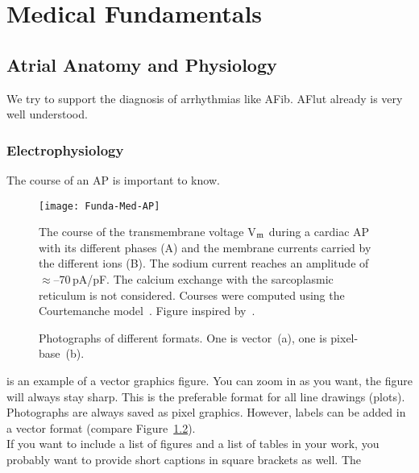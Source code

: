 \chapter{Medical Fundamentals}
\label{chap:medFund}


\section{Atrial Anatomy and Physiology}
\label{sec:anatomyPhysiology}

We try to support the diagnosis of arrhythmias like \ac{AFib}. \Ac{AFlut} already is very well understood.


\subsection{Electrophysiology}
\label{sec:anatomyPhysiology:elphy}

The course of an \ac{AP} is important to know.

\begin{figure}[tb]
 \centering
 \texttt{[image: Funda-Med-AP]}
 \caption{The course of the transmembrane voltage V$_\textnormal{m}$ during a cardiac \ac{AP} with its different phases (A) and the membrane currents carried by the different ions (B). The sodium current reaches an amplitude of $\approx$--70\,pA/pF. The calcium exchange with the sarcoplasmic reticulum is not considered. Courses were computed using the Courtemanche \etal model~\cite{courtemanche98}. Figure inspired by~\cite{schmidt10a}.}
 \label{fig:med:AP}
\end{figure}

\begin{figure}[ht]
\centering
{}
\hspace{0.05\textwidth}
\caption{Photographs of different formats. One is vector~(a), one is pixel-base~(b).}
 \label{fig:med:einsteinComparsion}
\end{figure}

 is an example of a vector graphics figure. You can zoom in as you want, the figure will always stay sharp. This is the preferable format for all line drawings (\eg plots). Photographs are always saved as pixel graphics. However, labels can be added in a vector format (compare Figure~\ref{fig:med:einsteinComparsion}).\\
If you want to include a list of figures and a list of tables in your work, you probably want to provide short captions in square brackets as well. The
